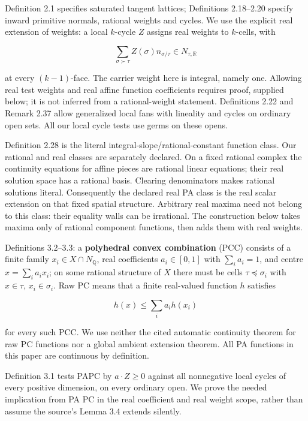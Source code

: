 \documentclass[
  10pt,
]{article}
\begin{document}
Definition 2.1 specifies saturated tangent lattices; Definitions
2.18--2.20 specify inward primitive normals, rational weights and
cycles. We use the explicit
real extension of weights: a local \(k\)-cycle \(Z\) assigns real
weights to \(k\)-cells, with

\[
\sum_{\sigma\succ\tau} Z(\sigma)n_{\sigma/\tau}
\in N_{\tau,\mathbb R}
\]

at every \((k-1)\)-face. The carrier weight here is integral, namely
one. Allowing real test weights and real affine function coefficients
requires proof, supplied below; it is not inferred from a
rational-weight statement. Definitions 2.22 and Remark 2.37 allow
generalized local fans with lineality and cycles on ordinary open sets.
All our local cycle tests use germs on these opens.

Definition 2.28 is the literal integral-slope/rational-constant function
class. Our rational and real classes are separately declared. On a fixed
rational complex the continuity equations for affine pieces are rational
linear equations; their real solution space has a rational basis.
Clearing denominators makes rational solutions literal. Consequently the
declared real PA class is the real scalar extension on that fixed
spatial structure. Arbitrary real maxima need not belong to this class:
their equality walls can be irrational. The construction below takes
maxima only of rational component functions, then adds them with real
weights.

Definitions 3.2--3.3: a \textbf{polyhedral convex combination} (PCC)
consists of a finite family \(x_i\in X\cap N_{\mathbb Q}\), real
coefficients \(a_i\in[0,1]\) with \(\sum_i a_i=1\), and centre
\(x=\sum_i a_i x_i\); on some rational structure of \(X\) there must be
cells \(\tau\preceq\sigma_i\) with \(x\in\tau\), \(x_i\in\sigma_i\). Raw
PC means that a finite real-valued function \(h\) satisfies

\[
h(x)\leq\sum_i a_i h(x_i)
\]

for every such PCC. We use neither the cited automatic continuity
theorem for raw PC functions nor a global ambient extension theorem. All
PA functions in this paper are continuous by definition.

Definition 3.1 tests PAPC by \(a\cdot Z\geq0\) against all nonnegative
local cycles of every positive dimension, on every ordinary open. We
prove the needed implication from PA PC in the real coefficient and real
weight scope, rather than assume the source's Lemma 3.4 extends
silently.
\end{document}
